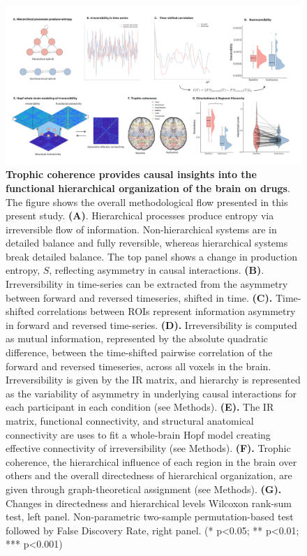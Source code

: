 \begin{figure}[h!]
    \centering
    \includegraphics[width=\textwidth]{images/Figure 1.png}
    \caption[Trophic coherence provides causal insights into
the functional hierarchical organization of the brain on drugs]{\textbf{Trophic coherence provides causal insights into
the functional hierarchical organization of the brain on drugs}. The
figure shows the overall methodological flow presented in this present
study. \textbf{(A)}. Hierarchical processes produce entropy via
irreversible flow of information. Non-hierarchical systems are in
detailed balance and fully reversible, whereas hierarchical systems
break detailed balance. The top panel shows a change in production
entropy, \(S\), reflecting asymmetry in causal interactions.
\textbf{(B)}. Irreversibility in time-series can be extracted from the
asymmetry between forward and reversed timeseries, shifted in time.
\textbf{(C).} Time-shifted correlations between ROIs represent
information asymmetry in forward and reversed time-series. \textbf{(D).}
Irreversibility is computed as mutual information, represented by the
absolute quadratic difference, between the time-shifted pairwise
correlation of the forward and reversed timeseries, across all voxels in
the brain. Irreversibility is given by the IR matrix, and hierarchy is
represented as the variability of asymmetry in underlying causal
interactions for each participant in each condition (see Methods).
\textbf{(E).} The IR matrix, functional connectivity, and structural
anatomical connectivity are uses to fit a whole-brain Hopf model
creating effective connectivity of irreversibility (see Methods).
\textbf{(F).} Trophic coherence, the hierarchical influence of each
region in the brain over others and the overall directedness of
hierarchical organization, are given through graph-theoretical
assignment (see Methods). \textbf{(G).} Changes in directedness and
hierarchical levels Wilcoxon rank-sum test, left panel. Non-parametric
two-sample permutation-based test followed by False Discovery Rate,
right panel. (* p\textless0.05; ** p\textless0.01; *** p\textless0.001)}
    \label{fig:overview}
\end{figure}

